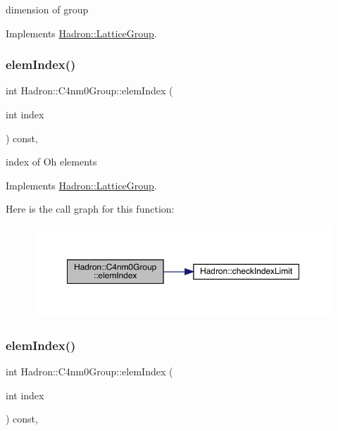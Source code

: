 dimension of group 

Implements \mbox{\hyperlink{structHadron_1_1LatticeGroup_abd8415698323796ef6a8605796ee3bea}{Hadron\+::\+Lattice\+Group}}.

\mbox{\label{structHadron_1_1C4nm0Group_a700a48f1865a634b774127d8710e1ecc}} 
\subsubsection{\texorpdfstring{elemIndex()}{elemIndex()}\hspace{0.1cm}{\footnotesize\ttfamily [1/2]}}
{\footnotesize\ttfamily int Hadron\+::\+C4nm0\+Group\+::elem\+Index (\begin{DoxyParamCaption}\item[{int}]{index }\end{DoxyParamCaption}) const\hspace{0.3cm}{\ttfamily [inline]}, {\ttfamily [virtual]}}

index of Oh elements 

Implements \mbox{\hyperlink{structHadron_1_1LatticeGroup_afb8e3ee60de059f75bce1044c694e1e8}{Hadron\+::\+Lattice\+Group}}.

Here is the call graph for this function\+:
\nopagebreak
\begin{figure}[H]
\begin{center}
\leavevmode
\includegraphics[width=350pt]{da/da1/structHadron_1_1C4nm0Group_a700a48f1865a634b774127d8710e1ecc_cgraph}
\end{center}
\end{figure}
\mbox{\label{structHadron_1_1C4nm0Group_a700a48f1865a634b774127d8710e1ecc}} 
\subsubsection{\texorpdfstring{elemIndex()}{elemIndex()}\hspace{0.1cm}{\footnotesize\ttfamily [2/2]}}
{\footnotesize\ttfamily int Hadron\+::\+C4nm0\+Group\+::elem\+Index (\begin{DoxyParamCaption}\item[{int}]{index }\end{DoxyParamCaption}) const\hspace{0.3cm}{\ttfamily [inline]}, {\ttfamily [virtual]}}


